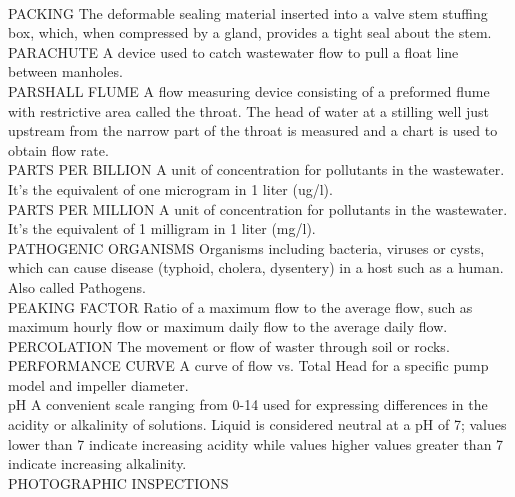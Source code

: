 \vspace{0.3cm}\\
PACKING
The deformable sealing material inserted into a valve stem stuffing box, which, when compressed by a gland, provides a tight seal about the stem.
\vspace{0.3cm}\\
PARACHUTE
A device used to catch wastewater flow to pull a float line between manholes. 
\vspace{0.3cm}\\
PARSHALL FLUME
A flow measuring device consisting of a preformed flume with restrictive area called the throat. The head of water at a stilling well just upstream from the narrow part of the throat is measured and a chart is used to obtain flow rate.
\vspace{0.3cm}\\
PARTS PER BILLION
A unit of concentration for pollutants in the wastewater. It’s the equivalent of one microgram in 1 liter (ug/l).
\vspace{0.3cm}\\
PARTS PER MILLION
A unit of concentration for pollutants in the wastewater. It’s the equivalent of 1 milligram in 1 liter (mg/l).
\vspace{0.3cm}\\
PATHOGENIC ORGANISMS
Organisms including bacteria, viruses or cysts, which can cause disease (typhoid, cholera, dysentery) in a host such as a human.  Also called Pathogens.
\vspace{0.3cm}\\
PEAKING FACTOR
Ratio of a maximum flow to the average flow, such as maximum hourly flow or maximum daily flow to the average daily flow. 
\vspace{0.3cm}\\
PERCOLATION
The movement or flow of waster through soil or rocks.
\vspace{0.3cm}\\
PERFORMANCE CURVE
A curve of flow vs. Total Head for a specific pump model and impeller diameter.
\vspace{0.3cm}\\
pH
A convenient scale ranging from 0-14 used for expressing differences in the acidity or alkalinity of solutions. Liquid is considered neutral at a pH of 7; values lower than 7 indicate increasing acidity while values higher values greater than 7 indicate increasing alkalinity.
\vspace{0.3cm}\\
PHOTOGRAPHIC INSPECTIONS

